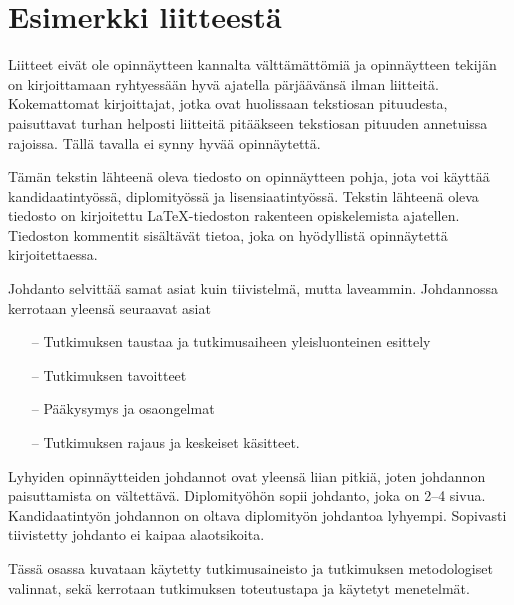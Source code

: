 \documentclass[english,12pt,a4paper,pdftex,sci,utf8]{aaltothesis}
\begin{document}
\clearpage

\thesisappendix

\section{Esimerkki liitteest\"a\label{LiiteA}}

Liitteet eiv\"at ole opinn\"aytteen kannalta v\"altt\"am\"att\"omi\"a ja
opinn\"aytteen tekij\"an on
kirjoittamaan ryhtyess\"a\"an hyv\"a ajatella p\"arj\"a\"av\"ans\"a ilman liitteit\"a.
Kokemattomat kirjoittajat, jotka ovat huolissaan
tekstiosan pituudesta, paisuttavat turhan
helposti liitteit\"a pit\"a\"akseen tekstiosan pituuden annetuissa rajoissa.
T\"all\"a tavalla ei synny hyv\"a\"a opinn\"aytett\"a.


T\"am\"an tekstin l\"ahteen\"a oleva tiedosto on opinn\"aytteen
pohja, jota voi k\"aytt\"a\"a kandidaatinty\"oss\"a, diplomity\"oss\"a ja
lisensiaatinty\"oss\"a. Tekstin
l\"ahteen\"a oleva tiedosto on kirjoitettu  \LaTeX-tiedoston rakenteen
opiskelemista ajatellen. Tiedoston kommentit sis\"alt\"av\"at
tietoa, joka on hy\"odyllist\"a opinn\"aytett\"a kirjoitettaessa.

Johdanto selvitt\"a\"a samat asiat kuin tiivistelm\"a, mutta
laveammin. Johdannossa kerrotaan yleens\"a seuraavat asiat

\begin{itemize}
\item[--]Tutkimuksen taustaa ja tutkimusaiheen yleisluonteinen esittely
\item[--]Tutkimuksen tavoitteet
\item[--]P\"a\"akysymys ja osaongelmat
\item[--]Tutkimuksen rajaus ja keskeiset k\"asitteet.
\end{itemize}

Lyhyiden opinn\"aytteiden johdannot ovat yleens\"a liian pitki\"a, joten
johdannon paisuttamista on v\"altett\"av\"a. Diplomity\"oh\"on sopii johdanto,
joka on 2--4 sivua. %
Kandidaatinty\"on johdannon on oltava diplomity\"on
johdantoa lyhyempi. Sopivasti tiivistetty johdanto ei kaipaa alaotsikoita.


T\"ass\"a osassa kuvataan k\"aytetty tutkimusaineisto ja
tutkimuksen metodologiset valinnat, sek\"a
kerrotaan tutkimuksen toteutustapa ja k\"aytetyt menetelm\"at.
\end{document}
